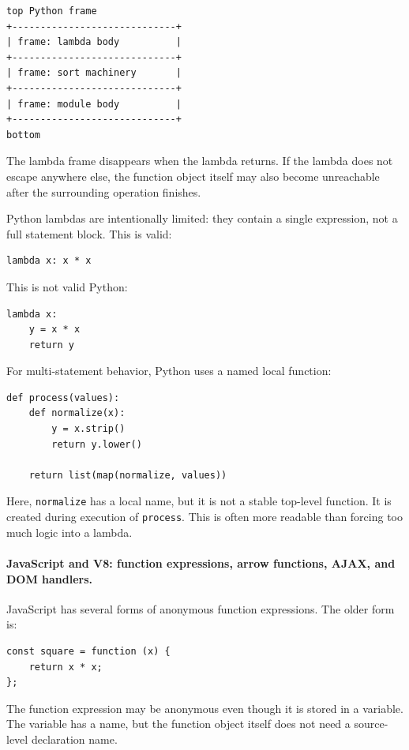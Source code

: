 \documentclass[a4paper,twoside]{report}
\begin{document}
\begin{verbatim}
top Python frame
+-----------------------------+
| frame: lambda body          |
+-----------------------------+
| frame: sort machinery       |
+-----------------------------+
| frame: module body          |
+-----------------------------+
bottom
\end{verbatim}

The lambda frame disappears when the lambda returns. If the lambda does not escape anywhere else, the function object itself may also become unreachable after the surrounding operation finishes.

Python lambdas are intentionally limited: they contain a single expression, not a full statement block. This is valid:

\begin{verbatim}
lambda x: x * x
\end{verbatim}

This is not valid Python:

\begin{verbatim}
lambda x:
    y = x * x
    return y
\end{verbatim}

For multi-statement behavior, Python uses a named local function:

\begin{verbatim}
def process(values):
    def normalize(x):
        y = x.strip()
        return y.lower()

    return list(map(normalize, values))
\end{verbatim}

Here, \texttt{normalize} has a local name, but it is not a stable top-level function. It is created during execution of \texttt{process}. This is often more readable than forcing too much logic into a lambda.

\paragraph{JavaScript and V8: function expressions, arrow functions, AJAX, and DOM handlers.}

JavaScript has several forms of anonymous function expressions. The older form is:

\begin{verbatim}
const square = function (x) {
    return x * x;
};
\end{verbatim}

The function expression may be anonymous even though it is stored in a variable. The variable has a name, but the function object itself does not need a source-level declaration name.
\end{document}
